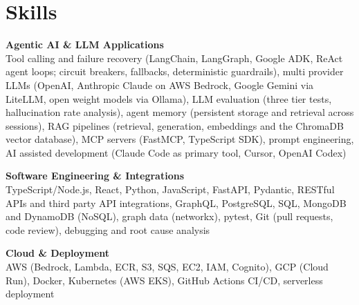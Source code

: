 \documentclass[a4paper,11pt]{article}
\newcommand{\skillgroup}[2]{{\color{navy}\textbf{#1}}\\ #2\par\vspace{3pt}}
\begin{document}
\section{Skills}
\skillgroup{Agentic AI \& LLM Applications}{Tool calling and failure recovery (LangChain, LangGraph, Google ADK, ReAct agent loops; circuit breakers, fallbacks, deterministic guardrails), multi provider LLMs (OpenAI, Anthropic Claude on AWS Bedrock, Google Gemini via LiteLLM, open weight models via Ollama), LLM evaluation (three tier tests, hallucination rate analysis), agent memory (persistent storage and retrieval across sessions), RAG pipelines (retrieval, generation, embeddings and the ChromaDB vector database), MCP servers (FastMCP, TypeScript SDK), prompt engineering, AI assisted development (Claude Code as primary tool, Cursor, OpenAI Codex)}
\skillgroup{Software Engineering \& Integrations}{TypeScript/Node.js, React, Python, JavaScript, FastAPI, Pydantic, RESTful APIs and third party API integrations, GraphQL, PostgreSQL, SQL, MongoDB and DynamoDB (NoSQL), graph data (networkx), pytest, Git (pull requests, code review), debugging and root cause analysis}
\skillgroup{Cloud \& Deployment}{AWS (Bedrock, Lambda, ECR, S3, SQS, EC2, IAM, Cognito), GCP (Cloud Run), Docker, Kubernetes (AWS EKS), GitHub Actions CI/CD, serverless deployment}
\end{document}
